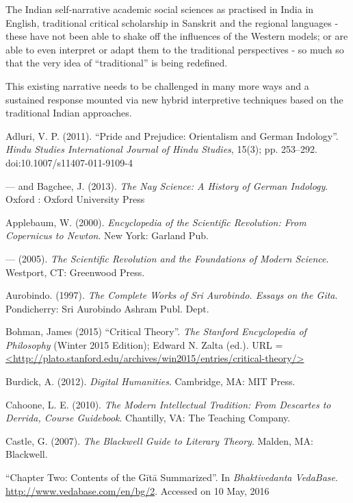 The Indian self-narrative academic social sciences as practised in India in English, traditional critical scholarship in Sanskrit and the regional languages  - these have not been able to shake off the influences of the Western models; or are able to even interpret or adapt them to the traditional perspectives - so much so that the very idea of ``traditional'' is being redefined.

This existing narrative needs to be challenged in many more ways and a sustained response mounted via new hybrid interpretive techniques based on the traditional Indian approaches. 

\begin{thebibliography}{99}
\itemsep=2pt
Adluri, V. P. (2011). ``Pride and Prejudice: Orientalism and German Indology''. {\sl Hindu Studies International Journal of Hindu Studies}, 15(3); pp. 253--292. doi:10.1007/s11407-011-9109-4

--- and Bagchee, J. (2013). {\sl The Nay Science: A History of German Indology}. 
Oxford : Oxford University Press

Applebaum, W. (2000). {\sl Encyclopedia of the Scientific Revolution: From Copernicus to Newton}. New York: Garland Pub.

--- (2005). {\sl The Scientific Revolution and the Foundations of Modern Science}. Westport, CT: Greenwood Press.

Aurobindo. (1997). {\sl The Complete Works of Sri Aurobindo. Essays on the Gita}. Pondicherry: Sri Aurobindo Ashram Publ. Dept.

Bohman, James (2015) ``Critical Theory''. {\sl The Stanford Encyclopedia of Philosophy} (Winter 2015 Edition); Edward N. Zalta (ed.). URL = \url{<http://plato.stanford.edu/archives/win2015/entries/critical-theory/>}

Burdick, A. (2012). {\sl Digital Humanities}. Cambridge, MA: MIT Press.

Cahoone, L. E. (2010). {\sl The Modern Intellectual Tradition: From Descartes to Derrida, Course Guidebook}. Chantilly, VA: The Teaching Company.

Castle, G. (2007). {\sl The Blackwell Guide to Literary Theory}. Malden, MA: Blackwell.

``Chapter Two: Contents of the Gītā Summarized''. In {\sl Bhaktivedanta VedaBase}. \url{http://www.vedabase.com/en/bg/2}. Accessed on 10 May, 2016


\end{thebibliography}
